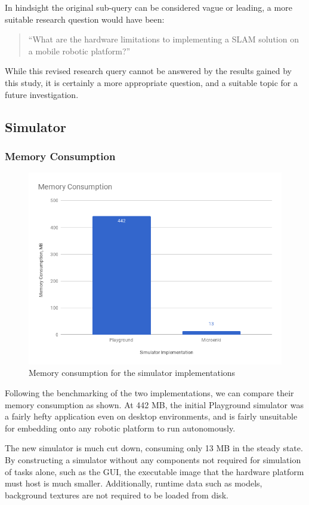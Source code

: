 In hindsight the original sub-query can be considered vague or leading, a more
suitable research question would have been:

\begin{quote}
``What are the hardware limitations to implementing a SLAM solution on a
mobile robotic platform?''
\end{quote}

While this revised research query cannot be answered by the results gained by
this study, it is certainly a more appropriate question, and a suitable topic
for a future investigation.


\subsection{Simulator}
\subsubsection{Memory Consumption}
\begin{figure}[!h]
    \centering
    \includegraphics[width=\textwidth]{memory.png}
    \caption{Memory consumption for the simulator implementations}
\end{figure}
Following the benchmarking of the two implementations, we can compare their
memory consumption as shown. At 442 MB, the initial Playground simulator was a
fairly hefty application even on desktop environments, and is fairly unsuitable
for embedding onto any robotic platform to run autonomously.

The new simulator is much cut down, consuming only 13 MB in the steady state.
By constructing a simulator without any components not required for simulation
of tasks alone, such as the GUI, the executable image that the hardware
platform must host is much smaller. Additionally, runtime data such as models,
background textures are not required to be loaded from disk.

